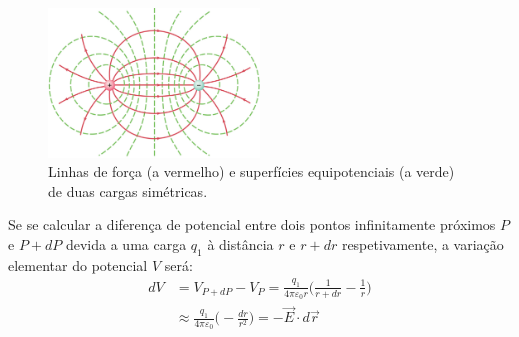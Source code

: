 \documentclass[a4paper,twoside,12pt]{article}      %
\begin{document}
\begin{figure}[tb]
  \centering 
	\includegraphics[width=0.5\textwidth]{./fig2-thomson} 
	\caption{ Linhas de força (a vermelho) e superfícies equipotenciais (a verde) de duas cargas simétricas. \label{fig:sup-equip}} 
\end{figure}

Se se calcular a diferença de potencial entre dois pontos infinitamente próximos $P$ e $P+dP$ devida a uma carga $q_1$ à distância $r$ e $r+dr$ respetivamente, a variação elementar do potencial $V$ será:
\begin{align}
d V &= V_{P+dP} - V_P = \frac{q_1}{4 \pi \varepsilon_0 r} \big(  \frac{1}{r + dr} -\frac{1}{r} \big)\nonumber\\
	 &\approx \frac{q_1}{4 \pi \varepsilon_0 } \big(  - \frac{dr}{r^2} \big) = - \vec{E} \cdot d \vec{r}  \end{align}
%
%


\end{document}
